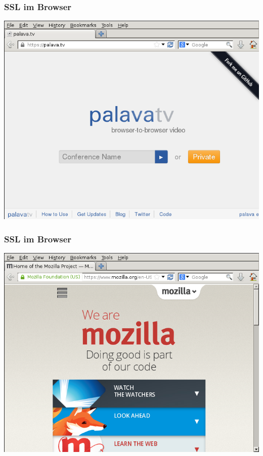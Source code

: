 \documentclass[12pt]{beamer}
\begin{document}
\begin{frame}
    \frametitle{SSL im Browser}
    \begin{center}
	\includegraphics[height=0.7\textheight]{img/ssl_verified.png}
    \end{center}
\end{frame}

\begin{frame}
    \frametitle{SSL im Browser}
    \begin{center}
	\includegraphics[height=0.7\textheight]{img/ssl_special.png}
    \end{center}
\end{frame}
\end{document}
